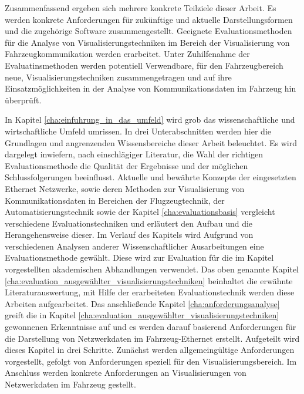 \documentclass[draft=false
              ,paper=a4
              ,twoside=false
              ,fontsize=11pt
              ,headsepline
              ,BCOR10mm
              ,DIV11
              ]{scrbook}
\newcommand{\TODO}[1]{\colorbox{yellow}{\textcolor{red}{[TODO: #1]}}}
\begin{document}
Zusammenfassend ergeben sich mehrere konkrete Teilziele dieser Arbeit. Es werden konkrete Anforderungen für zukünftige und aktuelle Darstellungsformen und die zugehörige Software zusammengestellt. Geeignete Evaluationsmethoden für die Analyse von Visualisierungstechniken im Bereich der Visualisierung von Fahrzeugkommunikation werden erarbeitet. Unter Zuhilfenahme der Evaluatinsmethoden werden potentiell Verwendbare, für den Fahrzeugbereich neue, Visualisierungstechniken zusammengetragen und auf ihre Einsatzmöglichkeiten in der Analyse von Kommunikationsdaten im Fahrzeug hin überprüft.


In Kapitel \ref{cha:einfuhrung_in_das_umfeld} wird grob das wissenschaftliche und wirtschaftliche Umfeld umrissen. In drei Unterabschnitten werden hier die Grundlagen und angrenzenden Wissensbereiche dieser Arbeit beleuchtet. Es wird dargelegt inwiefern, nach einschlägiger Literatur, die Wahl der richtigen Evaluationsmethode die Qualität der Ergebnisse und der möglichen Schlussfolgerungen beeinflusst. Aktuelle und bewährte Konzepte der eingesetzten Ethernet Netzwerke, sowie deren Methoden zur Visualisierung von Kommunikationsdaten in Bereichen der Flugzeugtechnik, der Automatisierungstechnik sowie der %
Kapitel \ref{cha:evaluationsbasis} vergleicht verschiedene Evaluationstechniken und erläutert den Aufbau und die Herangehensweise dieser. Im Verlauf des Kapitels wird Aufgrund von verschiedenen Analysen anderer Wissenschaftlicher Ausarbeitungen eine Evaluationsmethode gewählt. Diese wird zur Evaluation für die im Kapitel  vorgestellten akademischen Abhandlungen verwendet. Das oben genannte Kapitel \ref{cha:evaluation_ausgewählter_visualisierungstechniken} beinhaltet die erwähnte Literaturauswertung, mit Hilfe der erarbeiteten Evaluationstechnik werden diese Arbeiten aufgearbeitet. Das anschließende Kapitel \ref{cha:anforderungsanalyse} greift die in Kapitel \ref{cha:evaluation_ausgewählter_visualisierungstechniken} gewonnenen Erkenntnisse auf und es werden darauf basierend Anforderungen für die Darstellung von Netzwerkdaten im Fahrzeug-Ethernet erstellt. Aufgeteilt wird dieses Kapitel in drei Schritte. Zunächst werden allgemeingültige Anforderungen vorgestellt, gefolgt von Anforderungen speziell für den Visualisierungsbereich. Im Anschluss werden konkrete Anforderungen an Visualisierungen von Netzwerkdaten im Fahrzeug gestellt. 
\end{document}
